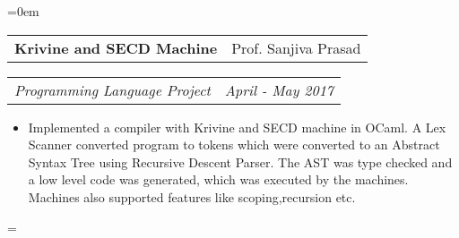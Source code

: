 \documentclass{article}
\makeatletter
\newenvironment{longversion}{}{} %
\newenvironment{absolutelynopagebreak}
  {\par\nobreak\vfil\penalty0\vfilneg
   \vtop\bgroup}
  {\par\xdef\tpd{\the\prevdepth}\egroup
   \prevdepth=\tpd}
\newcommand{\headerrow}[2]
{\begin{tabular*}{\linewidth}{l@{\extracolsep{\fill}}r}
	#1 &
	#2 \\
\end{tabular*}}
\makeatother
\begin{document}
\begin{absolutelynopagebreak}
\begin{longversion}
\begin{list} {}{\leftmargin=0em}



\item[]
\headerrow{ \textbf{Krivine and SECD Machine}} {Prof. Sanjiva Prasad}
\headerrow {\emph{Programming Language Project}}{\emph{April - May 2017}}
\begin{itemize} \item[] 
Implemented a compiler with Krivine and SECD machine in OCaml. A Lex Scanner converted program to tokens which were converted to an Abstract Syntax Tree using Recursive Descent Parser. The AST was type checked and a low level code was generated, which was executed by the machines. Machines also supported features like scoping,recursion etc.
\end{itemize}


\end{list}
\end{longversion}
\end{absolutelynopagebreak}
\end{document}
